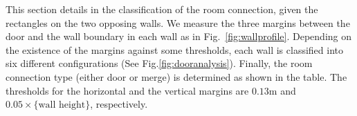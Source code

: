 This section details in the classification of the room connection, given
the rectangles on the two opposing walls.
We measure the three margins between the door and the wall boundary in
each wall as in Fig.~\ref{fig:wallprofile}. Depending on the existence
of the margins against some thresholds, each wall is classified into six
different configurations (See Fig.\ref{fig:dooranalysis}). Finally, the
room connection type (either door or merge) is determined as shown in
the table. The thresholds for the horizontal and the vertical margins
are $0.13$m and $0.05 \times \mbox{\{wall height\}}$, respectively.






%


